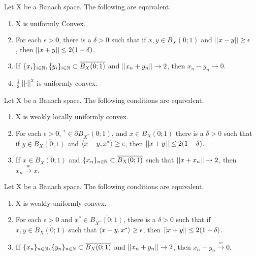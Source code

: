 \begin{prop}
    \label{prop:uniformlyconvexspaces}
    Let X be a Banach space. The following are equivalent. 
    \begin{enumerate}
        \item X is uniformly Convex.
        \item For each $\epsilon > 0$, there is a $\delta > 0$ such that if $x,y \in \overline{B_X(0;1)}$ and $\left|\left| x-y \right|\right| \geq \epsilon$, then $\left|\left| x+y \right|\right| \leq 2(1-\delta)$. 
        \item If $\{x_i\}_{i \in \mathbb{N}} , \{y_i\}_{i \in \mathbb{N}} \subset \overline{B_X(0;1)}$ and $\left|\left| x_n+y_n \right|\right| \to 2$, then $x_n-y_n \to 0$. 
        \item $\frac{1}{2} \left|\left| \cdot \right|\right|^2$ is uniformly convex. 
    \end{enumerate} 
\end{prop} 
\begin{prop}
    \label{prop:weaklylocallyuniformlyconvexspaces}
    Let X be a Banach space. The following conditions are equivalent. 
    \begin{enumerate}
        \item X is weakly locally uniformly convex. 
        \item For each $\epsilon > 0$, $^* \in \partial B_{X^*}(0;1)$, and $x \in \overline{B_X(0;1)}$ there is a $\delta > 0$ such that if $y \in \overline{B_X(0;1)}$ and $\left\langle x-y,x^* \right\rangle \geq \epsilon$, then $\left|\left| x+y \right|\right| \leq 2(1-\delta)$. 
        \item If $x \in \overline{ B_X(0;1)}$ and $\{x_n\}_{n \in \mathbb{N}} \subset \overline{B_X(0;1)}$ such that $\left|\left| x+x_n \right|\right| \to 2$, then $x_n \overset{w}{\to} x$. 
    \end{enumerate} 
\end{prop}
\begin{prop}
    \label{prop:weaklyuniformlyconvexspaces}
    Let X be a Banach space. The following conditions are equivalent. 
    \begin{enumerate}
        \item X is weakly uniformly convex. 
        \item For each $\epsilon > 0$ and $x^* \in \overline{ B_{X^*}(0;1)}$, there is a $\delta > 0$ such that if $x,y \in \overline{B_X(0;1)}$ such that $\left\langle x-y,x^* \right\rangle \geq \epsilon$, then $\left|\left| x+y \right|\right| \leq 2(1-\delta)$. 
        \item If $\{x_n\}_{n \in \mathbb{N}} , \{y_n\}_{n \in \mathbb{N}} \subset \overline{B_X(0;1)}$ and $\left|\left| x_n+y_n \right|\right| \to 2$, then $x_n-y_n \overset{w}{\to} 0$. 
    \end{enumerate}
\end{prop} 
